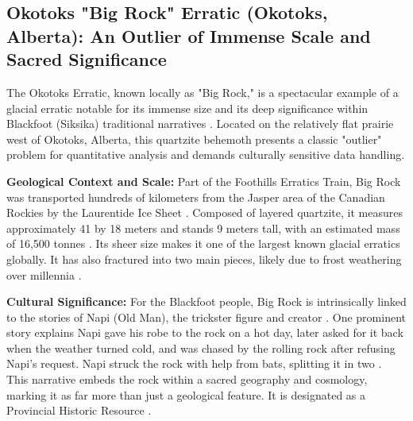 \documentclass[
11pt, %
english, %
singlespacing, %
headsepline, %
]{MastersDoctoralThesis} %
\begin{document}
\subsection{Okotoks "Big Rock" Erratic (Okotoks, Alberta): An Outlier of Immense Scale and Sacred Significance}
\label{subsec:okotoks}

The Okotoks Erratic, known locally as "Big Rock," is a spectacular example of a glacial erratic notable for its immense size and its deep significance within Blackfoot (Siksika) traditional narratives \cite{AlbertaOkotoks, Dempsey1997}. Located on the relatively flat prairie west of Okotoks, Alberta, this quartzite behemoth presents a classic "outlier" problem for quantitative analysis and demands culturally sensitive data handling.

\textbf{Geological Context and Scale:} Part of the Foothills Erratics Train, Big Rock was transported hundreds of kilometers from the Jasper area of the Canadian Rockies by the Laurentide Ice Sheet \cite{AlbertaOkotoks, Stalker1973}. Composed of layered quartzite, it measures approximately 41 by 18 meters and stands 9 meters tall, with an estimated mass of 16,500 tonnes \cite{AlbertaOkotoks}. Its sheer size makes it one of the largest known glacial erratics globally. It has also fractured into two main pieces, likely due to frost weathering over millennia \cite{Dempsey1997}.

\textbf{Cultural Significance:} For the Blackfoot people, Big Rock is intrinsically linked to the stories of Napi (Old Man), the trickster figure and creator \cite{Dempsey1997, Klassen1995}. One prominent story explains Napi gave his robe to the rock on a hot day, later asked for it back when the weather turned cold, and was chased by the rolling rock after refusing Napi's request. Napi struck the rock with help from bats, splitting it in two \cite{Dempsey1997}. This narrative embeds the rock within a sacred geography and cosmology, marking it as far more than just a geological feature. It is designated as a Provincial Historic Resource \cite{AlbertaOkotoks}.
\end{document}

